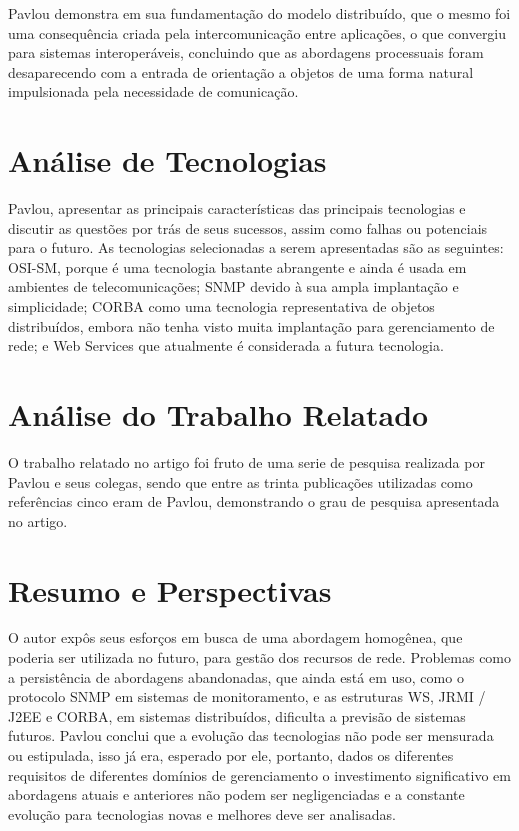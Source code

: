 \documentclass[12pt]{article}
\begin{document}
	Pavlou demonstra em sua fundamentação do modelo distribuído, que o mesmo foi uma consequência criada pela intercomunicação entre aplicações, o que convergiu para sistemas interoperáveis, concluindo que as abordagens processuais foram desaparecendo com a entrada de orientação a objetos de uma forma natural impulsionada pela necessidade de comunicação. 
	
\section{ Análise de Tecnologias}
	 Pavlou, apresentar as principais características das principais tecnologias e discutir as questões por trás de seus sucessos, assim como falhas ou potenciais para o futuro. As tecnologias selecionadas a serem apresentadas são as seguintes: OSI-SM, porque é uma tecnologia bastante abrangente e ainda é usada em ambientes de telecomunicações; SNMP devido à sua ampla implantação e simplicidade; CORBA como uma tecnologia representativa de objetos distribuídos, embora não tenha visto muita implantação para gerenciamento de rede; e Web Services que atualmente  é considerada a futura tecnologia.
	
\section{ Análise do Trabalho Relatado}
	O trabalho relatado no artigo foi fruto de uma serie de pesquisa realizada por Pavlou e seus colegas, sendo que entre as trinta publicações utilizadas como referências cinco eram de Pavlou, demonstrando o grau de pesquisa apresentada no artigo. 

\section{Resumo e Perspectivas}
	O autor expôs seus esforços em busca de uma abordagem homogênea, que poderia ser utilizada no futuro, para gestão dos recursos de rede. Problemas como a persistência de abordagens abandonadas, que ainda está em uso, como o protocolo SNMP em sistemas de monitoramento, e as estruturas WS, JRMI / J2EE e CORBA, em sistemas distribuídos, dificulta a previsão de sistemas futuros.
Pavlou conclui que a evolução das tecnologias não pode ser mensurada ou estipulada, isso já era, esperado por ele, portanto, dados os diferentes requisitos de diferentes domínios de gerenciamento o investimento significativo em abordagens atuais e anteriores não podem ser negligenciadas e a constante evolução para tecnologias novas e melhores deve ser analisadas.
\end{document}
